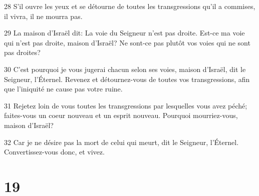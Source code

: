 \par 28 S'il ouvre les yeux et se détourne de toutes les transgressions qu'il a commises, il vivra, il ne mourra pas.
\par 29 La maison d'Israël dit: La voie du Seigneur n'est pas droite. Est-ce ma voie qui n'est pas droite, maison d'Israël? Ne sont-ce pas plutôt vos voies qui ne sont pas droites?
\par 30 C'est pourquoi je vous jugerai chacun selon ses voies, maison d'Israël, dit le Seigneur, l'Éternel. Revenez et détournez-vous de toutes vos transgressions, afin que l'iniquité ne cause pas votre ruine.
\par 31 Rejetez loin de vous toutes les transgressions par lesquelles vous avez péché; faites-vous un coeur nouveau et un esprit nouveau. Pourquoi mourriez-vous, maison d'Israël?
\par 32 Car je ne désire pas la mort de celui qui meurt, dit le Seigneur, l'Éternel. Convertissez-vous donc, et vivez.

\chapter{19}

